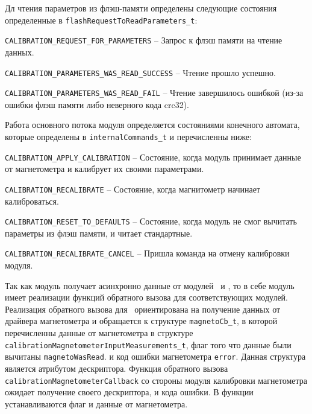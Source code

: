 Дл чтения параметров из флэш-памяти определены следующие состояния определенные в \lstinline{flashRequestToReadParameters_t}:

\begin{enumerate_num}
    \item \lstinline{CALIBRATION_REQUEST_FOR_PARAMETERS} -- Запрос к флэш памяти на чтение данных.
    \item \lstinline{CALIBRATION_PARAMETERS_WAS_READ_SUCCESS} -- Чтение прошло успешно.
    \item \lstinline{CALIBRATION_PARAMETERS_WAS_READ_FAIL} -- Чтение завершилось ошибкой (из-за ошибки флэш памяти либо неверного кода crc32).
\end{enumerate_num}

Работа основного потока модуля определяется состояниями конечного автомата, которые определены в \lstinline{internalCommands_t} и перечисленны ниже:

\begin{enumerate_num}
    \item \lstinline{CALIBRATION_APPLY_CALIBRATION} -- Состояние, когда модуль принимает данные от магнетометра и калибрует их своими параметрами.
    \item \lstinline{CALIBRATION_RECALIBRATE} -- Состояние, когда магнитометр начинает калиброваться.
    \item \lstinline{CALIBRATION_RESET_TO_DEFAULTS} -- Состояние, когда модуль не смог вычитать параметры из флэш памяти, и читает стандартные.
    \item \lstinline{CALIBRATION_RECALIBRATE_CANCEL} -- Пришла команда на отмену калибровки модуля.
\end{enumerate_num}

Так как модуль получает асинхронно данные от модулей \modulePerifery~и \moduleFlashMemory , то в себе модуль имеет реализации функций обратного вызова для соответствующих модулей.
Реализация обратного вызова для \modulePerifery~ориентирована на получение данных от драйвера магнетометра и обращается к структуре \lstinline{magnetoCb_t},
в которой перечисленны данные от магнетометра в структуре \lstinline{calibrationMagnetometerInputMeasurements_t}, флаг того что данные были вычитаны \lstinline{magnetoWasRead}.
и код ошибки магнетометра \lstinline{error}. Данная структура является атрибутом дескриптора. Функция обратного вызова \lstinline{calibrationMagnetometerCallback} 
со стороны модуля калибровки магнетометра ожидает получение своего дескриптора, и кода ошибки. В функции устанавливаются флаг и данные от магнетометра.

